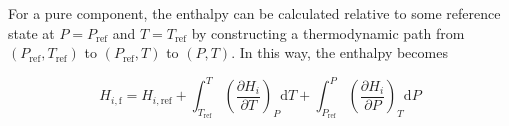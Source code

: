 \documentclass[11pt]{article}
\newcommand{\textref}{\text{ref}}
\newcommand{\textf}{\text{f}}
\begin{document}
    For a pure component, the enthalpy can be calculated relative to some reference state at $P=P_\text{ref}$
    and $T=T_\text{ref}$ by constructing a thermodynamic path from $(P_\text{ref}, T_{\text{ref}})$
    to $(P_\text{ref}, T)$ to $(P, T)$.
    In this way, the enthalpy becomes

    \begin{equation}
        H_{i,\textf} = H_{i,\text{ref}} + \int_{T_{\textref}}^T\left(\frac{\partial H_i}{\partial T}\right)_P\mathrm{d}T
        + \int_{P_{\textref}}^P\left(\frac{\partial H_i}{\partial P}\right)_T\mathrm{d}P
    \end{equation}


    
    
\end{document}
